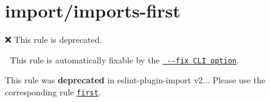 \chapter{import/imports-\/first}
\hypertarget{md_node__modules_2eslint-plugin-import_2docs_2rules_2imports-first}{}\label{md_node__modules_2eslint-plugin-import_2docs_2rules_2imports-first}
\label{md_node__modules_2eslint-plugin-import_2docs_2rules_2imports-first_autotoc_md10849}%
%
 ❌ This rule is deprecated.

🔧 This rule is automatically fixable by the \href{https://eslint.org/docs/latest/user-guide/command-line-interface\#--fix}{\texttt{ {\ttfamily -\/-\/fix} CLI option}}.

This rule was {\bfseries{deprecated}} in eslint-\/plugin-\/import v2... Please use the corresponding rule \href{https://github.com/import-js/eslint-plugin-import/blob/HEAD/docs/rules/first.md}{\texttt{ {\ttfamily first}}}. 